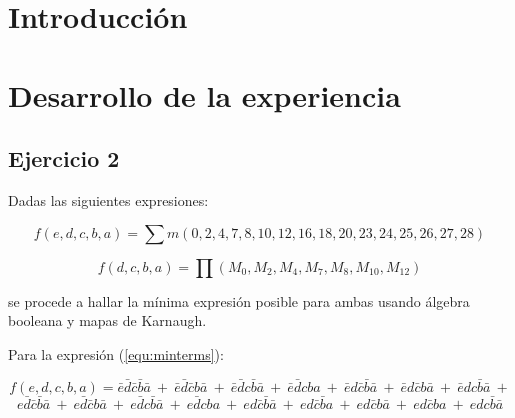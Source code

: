 \documentclass[a4paper]{article}
\begin{document}




\section*{Introducción}


\section*{Desarrollo de la experiencia}


\subsection*{Ejercicio 2}

Dadas las siguientes expresiones:

\begin{equation}
f \left( e,d,c,b,a \right) = \sum m \left( 0,2,4,7,8,10,12,16,18,20,23,24,25,26,27,28 \right)
\label{equ:minterms}
\end{equation}

\begin{equation}
f \left( d,c,b,a \right) = \prod \left( M_0,M_2,M_4,M_7,M_8,M_10,M_{12} \right)
\label{equ:maxterms}
\end{equation}

se procede a hallar la mínima expresión posible para ambas usando álgebra booleana y mapas de Karnaugh.

Para la expresión (\ref{equ:minterms}):
\begin{center}
\[
	f \left( e,d,c,b,a \right) = \bar{e}\bar{d}\bar{c}\bar{b}\bar{a} \ + \ \bar{e}\bar{d}\bar{c}b\bar{a} \ + \ \bar{e}\bar{d}c\bar{b}\bar{a} \ + \ \bar{e}\bar{d}cba \ + \ \bar{e}d\bar{c}\bar{b}\bar{a} \ + \ \bar{e}d\bar{c}b\bar{a} \ + \ \bar{e}dc\bar{b}\bar{a} \ +
\]
\[
	e\bar{d}\bar{c}\bar{b}\bar{a} \ + \ e\bar{d}\bar{c}b\bar{a} \ + \ e\bar{d}c\bar{b}\bar{a} \ + \ e\bar{d}cba \ + \ ed\bar{c}\bar{b}\bar{a}\ + \ ed\bar{c}\bar{b}a \ + \ ed\bar{c}b\bar{a} \ + \ ed\bar{c}ba \ + \ edc\bar{b}\bar{a} 
\]
\end{center}
\end{document}
